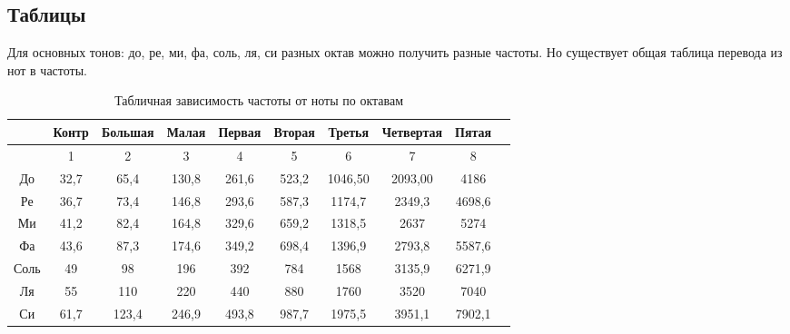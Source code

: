 \subsection{Таблицы}
Для основных тонов: до, ре, ми, фа, соль, ля, си разных октав можно получить разные частоты. Но существует общая таблица перевода из нот в частоты.
\begin{table}[!ht]
    \centering
    \begin{tabular}{|c|c|c|c|c|c|c|c|c|c|}
    \hline
           & \textbf{Контр} & \textbf{Большая} & \textbf{Малая} & \textbf{Первая} & \textbf{Вторая} & \textbf{Третья} & \textbf{Четвертая} & \textbf{Пятая} \\ \hline
           & 1              & 2                & 3              & 4               & 5               & 6               & 7                  & 8              \\ \hline
    До     & 32,7           & 65,4             & 130,8          & 261,6           & 523,2           & 1046,50         & 2093,00            & 4186           \\ \hline
    Ре     & 36,7           & 73,4             & 146,8          & 293,6           & 587,3           & 1174,7          & 2349,3             & 4698,6         \\ \hline
    Ми     & 41,2           & 82,4             & 164,8          & 329,6           & 659,2           & 1318,5          & 2637               & 5274           \\ \hline
    Фа     & 43,6           & 87,3             & 174,6          & 349,2           & 698,4           & 1396,9          & 2793,8             & 5587,6         \\ \hline
    Соль   & 49             & 98               & 196            & 392             & 784             & 1568            & 3135,9             & 6271,9         \\ \hline
    Ля     & 55             & 110              & 220            & 440             & 880             & 1760            & 3520               & 7040           \\ \hline
    Си     & 61,7           & 123,4            & 246,9          & 493,8           & 987,7           & 1975,5          & 3951,1             & 7902,1         \\ \hline
    \end{tabular}
    \caption{Табличная зависимость частоты от ноты по октавам}
    \label{tab:zavisimost_not}
\end{table}


